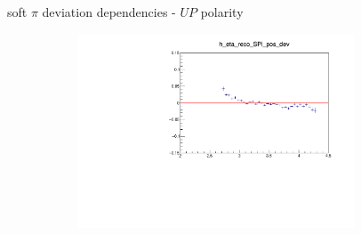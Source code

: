 \documentclass[11pt]{beamer}
\begin{document}
\begin{frame}{soft $\pi$ deviation dependencies - $UP$ polarity}
\begin{figure}
\begin{subfigure}{0.45\textwidth}
\end{subfigure}
\begin{subfigure}{0.45\textwidth}
\includegraphics[width=0.9\textwidth]{third/up_pdf/deviation/h_eta_reco_SPi_pos_dev.pdf}
\end{subfigure}
\end{figure}
\end{frame}
\end{document}
